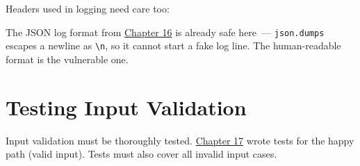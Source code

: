 \noindent{}Headers used in logging need care too:

\begin{codebox}[short]

\begin{Shaded}
\begin{Highlighting}[]

\OperatorTok{=}\NormalTok{, }\NormalTok{)[:}\NormalTok{]  }
\OperatorTok{=}\NormalTok{, }\NormalTok{, }\NormalTok{)  }
\end{Highlighting}
\end{Shaded}

\end{codebox}

\noindent{}The JSON log format from \hyperref[ch:16-logging-error-handling]{Chapter 16} is already safe here~--- \texttt{json.dumps} escapes a newline as \texttt{\textbackslash{}n}, so it cannot start a fake log line. The human-readable format is the vulnerable one.

\setcounter{section}{6}
\section{Testing Input Validation}\label{31-input-handling:317-testing-input-validation}

Input validation must be thoroughly tested. \hyperref[ch:17-build-process]{Chapter 17} wrote tests for the happy path (valid input). Tests must also cover all invalid input cases.

